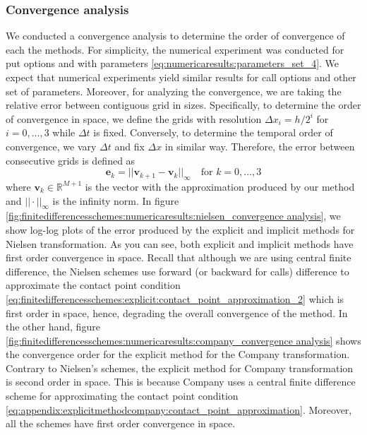 \subsubsection{Convergence analysis} \label{sec:finitediferencesschemes:numericalresults:convergenceanalysis}

We conducted a convergence analysis to determine the order of convergence of each the methods. For simplicity, the numerical experiment was conducted for put options and with parameters \eqref{eq:numericaresults:parameters_set_4}. We expect that numerical experiments yield similar results for call options and other set of parameters. Moreover, for analyzing the convergence, we are taking the relative error between contiguous grid in sizes. Specifically, to determine the order of convergence in space, we define the grids with resolution $\Delta{x}_i=h/2^i$ for $i=0,\dots,3$ while $\Delta{t}$ is fixed. Conversely, to determine the temporal order of convergence, we vary $\Delta{t}$ and fix $\Delta{x}$ in similar way. Therefore, the error between consecutive grids is defined as
\begin{equation}
  \mathbf{e}_k = ||\mathbf{v}_{k+1} - \mathbf{v}_{k}||_{\infty} \quad \text{for $k=0,\dots,3$}
  \label{eq:finitedifferencesschemes:numericalresults:consecutive_error}
\end{equation}
where $\mathbf{v}_{k}\in\mathbb{R}^{M+1}$ is the vector with the approximation produced by our method and $||\cdot||_{\infty}$ is the infinity norm. In figure \eqref{fig:finitedifferencesschemes:numericaresults:nielsen_convergence analysis}, we show log-log plots of the error produced by the explicit and implicit methods for Nielsen transformation. As you can see, both explicit and implicit methods have first order convergence in space. Recall that although we are using central finite difference, the Nielsen schemes use forward (or backward for calls) difference to approximate the contact point condition \eqref{eq:finitedifferencesschemes:explicit:contact_point_approximation_2} which is first order in space, hence, degrading the overall convergence of the method. In the other hand, figure \eqref{fig:finitedifferencesschemes:numericaresults:company_convergence analysis} shows the convergence order for the explicit method for the Company transformation. Contrary to Nielsen's schemes, the explicit method for Company transformation is second order in space. This is because Company uses a central finite difference scheme for approximating the contact point condition \eqref{eq:appendix:explicitmethodcompany:contact_point_approximation}. Moreover, all the schemes have first order convergence in space.
